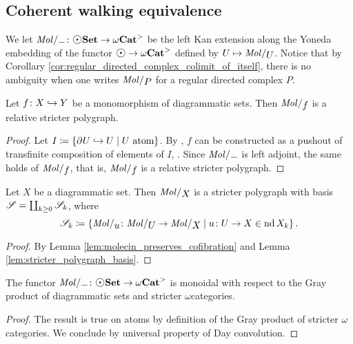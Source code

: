 \subsection{Coherent walking equivalence}

We let \( \molecin{-} \colon \dgmSet \to \somegaCat \) be the left Kan extension along the Yoneda embedding of the functor \( \atom \to \somegaCat \) defined by \( U \mapsto \molecin{U} \).
Notice that by Corollary \ref{cor:regular_directed_complex_colimit_of_itself}, there is no ambiguity when one writes \( \molecin{P} \) for a regular directed complex \( P \).

\begin{lem} \label{lem:molecin_preserves_cofibration}
    Let \( f \colon X \hookrightarrow Y \) be a monomorphism of diagrammatic sets.
    Then \( \molecin{f} \) is a relative stricter polygraph.
\end{lem}
\begin{proof}
    Let \( I \coloneqq \left\{ {\partial_{}^{} U \hookrightarrow U \mid U \text{ atom}} \right\} \).
    By \cite[Remark 2.9]{chanavat2024htpy}, \( f \) can be constructed as a pushout of transfinite composition of elements of \( I \), .
    Since \( \molecin{-} \) is left adjoint, the same holds of \( \molecin{f} \), that is, \( \molecin{f} \) is a relative stricter polygraph.
\end{proof}

\begin{cor} \label{cor:molecin_polygraph_with_basis}
    Let \( X \) be a diagrammatic set. 
    Then \( \molecin{X} \) is a stricter polygraph with basis \( \mathscr{S} = \coprod_{k \geq 0} \mathscr{S}_k \), where
    \begin{equation*}
        \cls{S}_k \eqdef \set{\molecin{u} \colon \molecin{U} \to \molecin{X} \mid u \colon U \to X \in \gr{k}{\nd X}}.
    \end{equation*}
\end{cor}
\begin{proof}
    By Lemma \ref{lem:molecin_preserves_cofibration} and Lemma \ref{lem:stricter_polygraph_basis}.
\end{proof}

\begin{lem} \label{lem:molecin_monoidal}
    The functor \( \molecin{-} \colon \dgmSet \to \somegaCat \) is monoidal with respect to the Gray product of diagrammatic sets and stricter \( \omega \)\nbd categories.
\end{lem}
\begin{proof}
    The result is true on atoms by definition of the Gray product of stricter \( \omega \)\nbd categories.
    We conclude by universal property of Day convolution.
\end{proof}

